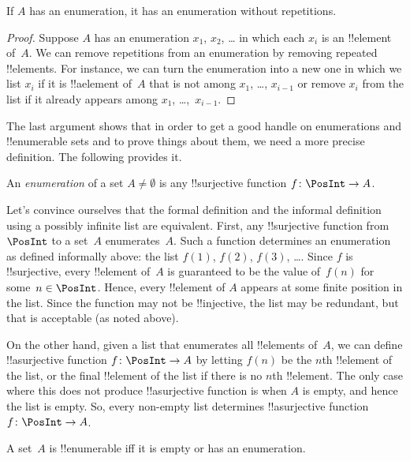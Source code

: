 \begin{prop}
  If $A$ has an enumeration, it has an enumeration without
  repetitions.
\end{prop}

\begin{proof}
  Suppose $A$ has an enumeration $x_1$, $x_2$, \dots{} in which each
  $x_i$ is an !!{element} of~$A$.  We can remove repetitions from an
  enumeration by removing repeated !!{element}s. For instance, we can
  turn the enumeration into a new one in which we list $x_i$ if
  it is !!a{element} of~$A$ that is not among $x_1$, \dots,
  $x_{i-1}$ or remove $x_i$ from the list if it already appears among
  $x_1$, \dots,~$x_{i-1}$.
\end{proof}

The last argument shows that in order to get a good handle on
enumerations and !!{enumerable} sets and to prove things about them,
we need a more precise definition.  The following provides it.

\begin{defn} 
An \emph{enumeration} of a set $A \neq \emptyset$ is any
!!{surjective} function $f \colon \PosInt \to A$.
\end{defn}

\begin{explain}
Let's convince ourselves that the formal definition and the informal
definition using a possibly infinite list are equivalent. First, any
!!{surjective} function from $\PosInt$ to a set~$A$ enumerates~$A$.
Such a function determines an enumeration as defined informally above:
the list $f(1)$, $f(2)$, $f(3)$, \dots. Since $f$ is !!{surjective},
every !!{element} of~$A$ is guaranteed to be the value of~$f(n)$ for
some~$n \in \PosInt$. Hence, every !!{element} of $A$ appears at some
finite position in the list. Since the function may not be
!!{injective}, the list may be redundant, but that is acceptable (as
noted above).

On the other hand, given a list that enumerates all !!{element}s
of~$A$, we can define !!a{surjective} function $f\colon \PosInt \to A$
by letting $f(n)$ be the $n$th !!{element} of the list, or the final
!!{element} of the list if there is no $n$th !!{element}. The only
case where this does not produce !!a{surjective} function is when $A$ is
empty, and hence the list is empty. So, every non-empty list
determines !!a{surjective} function $f\colon \PosInt \to A$.
\end{explain}

\begin{defn}
  A set~$A$ is !!{enumerable} iff it is empty or has an enumeration.
\end{defn}

